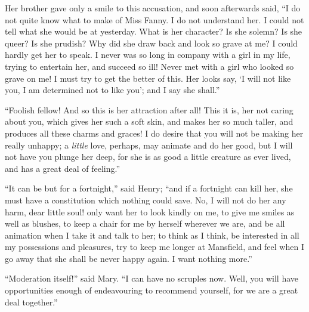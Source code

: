\documentclass{article}
\begin{document}
Her brother gave only a smile to this accusation,
and soon afterwards said, ``I do not quite know what to make
of Miss Fanny.  I do not understand her.  I could not tell
what she would be at yesterday.  What is her character?
Is she solemn?  Is she queer?  Is she prudish?  Why did
she draw back and look so grave at me?  I could hardly get
her to speak.  I never was so long in company with a girl
in my life, trying to entertain her, and succeed so ill!
Never met with a girl who looked so grave on me!
I must try to get the better of this.  Her looks say,
`I will not like you, I am determined not to like you';
and I say she shall.''

``Foolish fellow!  And so this is her attraction after all!
This it is, her not caring about you, which gives
her such a soft skin, and makes her so much taller,
and produces all these charms and graces!  I do desire
that you will not be making her really unhappy;
a \emph{little} love, perhaps, may animate and do her good,
but I will not have you plunge her deep, for she is as
good a little creature as ever lived, and has a great
deal of feeling.''

``It can be but for a fortnight,'' said Henry; ``and if a
fortnight can kill her, she must have a constitution
which nothing could save.  No, I will not do her any harm,
dear little soul! only want her to look kindly on me,
to give me smiles as well as blushes, to keep a chair
for me by herself wherever we are, and be all animation
when I take it and talk to her; to think as I think,
be interested in all my possessions and pleasures,
try to keep me longer at Mansfield, and feel when I
go away that she shall be never happy again.  I want
nothing more.''

``Moderation itself!'' said Mary.  ``I can have no scruples now.
Well, you will have opportunities enough of endeavouring
to recommend yourself, for we are a great deal together.''
\end{document}
